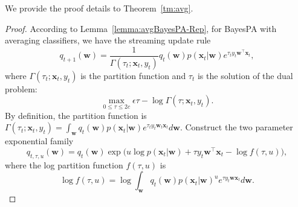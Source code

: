 \documentclass[twoside,11pt]{article}
\newcommand{\xv}{\bm{x}}
\newcommand{\wv}{\bm{w}}
\newcommand{\eat}[1]{}
\newcommand{\ep}{\mathbb{E}}
\newcommand{\strin}[1]{\todo[size=\small, color=green!40]{\bf\sf  #1}}
\newcommand{\jun}[1]{\marginpar{\color{blue}\tiny{Jun: #1}}}
\begin{document}
\appendix

\section{}\label{app:regret-bound}
We provide the proof details to Theorem~\ref{tm:avg}.
\begin{proof}%
According to Lemma~\ref{lemma:avgBayesPA-Rep}, for BayesPA with averaging classifiers, we have the streaming update rule
\begin{equation*} %
q_{t+1}(\wv) = \frac{1}{\Gamma(\tau_t; \xv_t, y_t)} q_t(\wv) p(\xv_t | \wv)e^{\tau_t y_t \wv^\top \xv_t},
\end{equation*}
where $\Gamma(\tau_t; \xv_t, y_t)$ is the partition function and $\tau_t$ is the solution of the dual problem:
\begin{equation} \label{eq:bayespa_dual}
\max\limits_{0 \leq \tau \leq 2c}{\epsilon \tau - \log \Gamma(\tau; \xv_t, y_t)}.
\end{equation}
By definition, the partition function is
$\Gamma(\tau_t; \xv_t, y_t) = \int_{\wv}{q_t(\wv) p(\xv_t|\wv) e^{\tau_t y_t \wv_t \xv_t} d\wv}$. Construct the two parameter exponential family
\begin{equation*}
q_{t,\tau, u}(\wv) = q_t(\wv) \exp\Big(u \log p(\xv_t | \wv)+\tau y_t \wv^\top \xv_t-\log f(\tau, u)\Big),
\end{equation*}
where the log partition function $f(\tau, u)$ is
\begin{equation}
\log f(\tau, u) = \log \int_{\wv}{q_t(\wv) p(\xv_t | \wv)^u e^{\tau y_t \wv \xv_t} d\wv}. \nonumber
\end{equation}
\eat{which has the following properties
\begin{equation*}
\log f(0,0) = 0.
\end{equation*}
\begin{equation*}
\frac{\partial}{\partial u} f(\tau, u) = \ep_{q_{t,\tau, u}(\wv)}[\log p(\xv_t | \wv)].
\end{equation*}
\begin{equation*}
\frac{\partial}{\partial \tau} f(\tau, u) = \ep_{q_{t, \tau, u}(\wv)}[y_t \wv \xv_t].
\end{equation*}
\begin{equation*}
\frac{\partial^2}{\partial \tau \partial u} f(\tau, u) = \frac{\partial^2}{\partial u \partial \tau} f(\tau, u) = 0.

\end{equation*}}
\end{proof}
\end{document}
